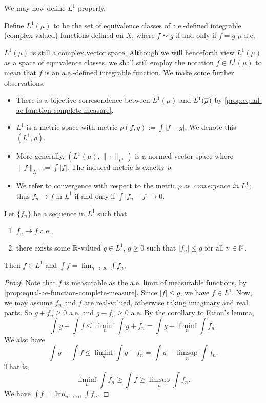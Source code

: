 \documentclass[12pt]{article} %
\begin{document}
We may now define $L^1$ properly.

\begin{definition}
    Define $L^1(\mu)$ to be the set of equivalence classes of a.e.-defined integrable (complex-valued) functions defined on $X$, where $f \sim g$ if and only if $f = g$ $\mu$-a.e.
\end{definition}

\begin{remark}
    $L^1(\mu)$ is still a complex vector space. Although we will henceforth view $L^1(\mu)$ as a space of equivalence classes, we shall still employ the notation $f \in L^1(\mu)$ to mean that $f$ is an a.e.-defined integrable function. We make some further observations.\begin{itemize}
        \item There is a bijective corresondence between $L^1(\mu)$ and $L^1(\overline{\mu})$ by \cref{prop:equal-ae-function-complete-measure}.
        \item $L^1$ is a metric space with metric $\rho(f, g) := \int |f-g|$. We denote this $(L^1, \rho)$.
        \item More generally, $(L^1(\mu), \|\cdot\|_{L^1})$ is a normed vector space where $\|f\|_{L^1} := \int |f|$. The induced metric is exactly $\rho$.
        \item We refer to convergence with respect to the metric $\rho$ as \textit{convergence in $L^1$}; thus $f_n \to f$ in $L^1$ if and only if $\int |f_n - f| \to 0$.
    \end{itemize}
\end{remark}

\begin{theorem}
    Let $\{f_n\}$ be a sequence in $L^1$ such that \begin{enumerate}
        \item $f_n \to f$ a.e.,
        \item there exists some $\mathbb{R}$-valued $g \in L^1$, $g \geq 0$ such that $|f_n| \leq g$ for all $n \in \mathbb{N}$.
    \end{enumerate}
    Then $f \in L^1$ and $\int f = \lim_{n\to \infty} \int f_n$.
\end{theorem}

\begin{proof}
    Note that $f$ is measurable as the a.e. limit of measurable functions, by \cref{prop:equal-ae-function-complete-measure}. Since $|f| \leq g$, we have $f \in L^1$. Now, we may assume $f_n$ and $f$ are real-valued, otherwise taking imaginary and real parts. So $g + f_n \geq 0$ a.e. and $g - f_n \geq 0$ a.e. By the corollary to Fatou's lemma, \[\int g + \int f \leq \liminf_n \int g + f_n = \int g + \liminf_n \int f_n.\] We also have \[\int g - \int f \leq \liminf_n \int g - f_n = \int g - \limsup_n \int f_n.\] That is, \[\liminf_n \int f_n \geq \int f \geq \limsup_n \int f_n.\] We have $\int f = \lim_{n \to \infty} \int f_n$.
\end{proof}
\end{document}
